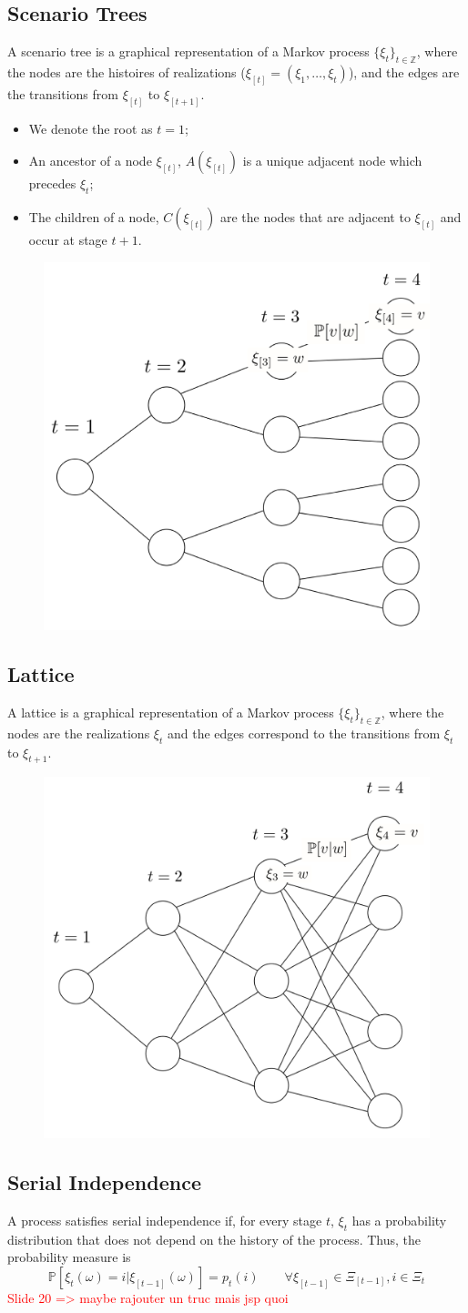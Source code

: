 \documentclass[12pt, openany]{report}
\renewcommand{\P}{\mathbb{P}}
\newcommand{\Z}{\mathbb{Z}}
\theoremstyle{definition}
\begin{document}
\subsection{Scenario Trees}
A scenario tree is a graphical representation of a Markov process $\{\xi_t\}_{t\in \Z}$, where the nodes are the histoires of realizations ($\xi_{[t]}=(\xi_1,\dots,\xi_t)$), and the edges are the transitions from $\xi_{[t]}$ to $\xi_{[t+1]}$.
\begin{itemize}
	\item We denote the root as $t=1$;
	\item An ancestor of a node $\xi_{[t]}$, $A(\xi_{[t]})$ is a unique adjacent node which precedes $\xi_t$;
	\item The children of a node, $C(\xi_{[t]})$ are the nodes that are adjacent to $\xi_{[t]}$ and occur at stage $t+1$.
\end{itemize}
\begin{figure}[H]
	\centering 
	\includegraphics[width = .3\textwidth]{img/tree.png}
\end{figure}
\subsection{Lattice}
A lattice is a graphical representation of a Markov process $\{\xi_t\}_{t\in \Z}$, where the nodes are the realizations $\xi_t$ and the edges correspond to the transitions from $\xi_t$ to $\xi_{t+1}$. 
\begin{figure}[H]
	\centering 
	\includegraphics[width = .3\textwidth]{img/lattice.png}
\end{figure}
\subsection{Serial Independence}
A process satisfies serial independence if, for every stage $t$, $\xi_t$ has a probability distribution that does not depend on the history of the process. Thus, the probability measure is 
\begin{equation}
	\P[\xi_t(\omega)=i|\xi_{[t-1]}(\omega)] = p_t(i) \qquad \forall \xi_{[t-1]}\in\Xi_{[t-1]}, i\in\Xi_t
\end{equation}
\textcolor{red}{Slide 20 => maybe rajouter un truc mais jsp quoi}
\end{document}
